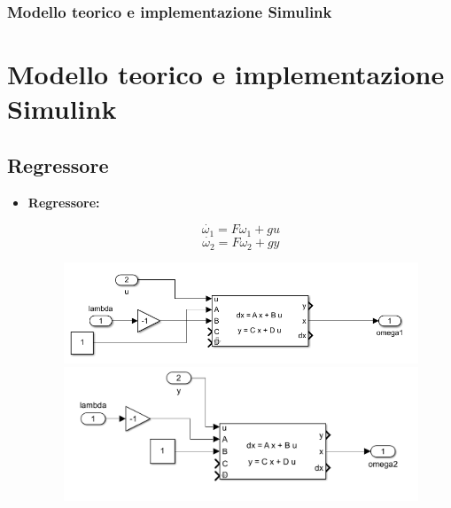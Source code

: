 \documentclass{beamer}
\begin{document}
\begin{frame}
	\frametitle{Modello teorico e implementazione Simulink}
	\section{Modello teorico e implementazione Simulink}
    \subsection{Regressore}
	\begin{itemize}
        \item \textbf{Regressore:}
        \begin{minipage}[t]{0.45\textwidth}
            \begin{equation}
                \dot{\omega_{1}}=F\omega_{1}+gu
            \end{equation}
            \begin{equation}
                \dot{\omega_{2}}=F\omega_{2}+gy
            \end{equation}
        \end{minipage}
        \begin{minipage}[t]{0.45\textwidth}
            \begin{figure}
                \includegraphics[scale=0.3]{2022-05-28-14-41-25.png}%
                \includegraphics[scale=0.3]{2022-05-28-14-42-11.png}%
            \end{figure}
        \end{minipage}
    \end{itemize}
\end{frame}
\end{document}
